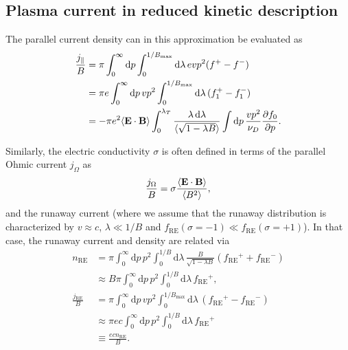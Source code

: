 \documentclass[11pt,a4paper]{article}
\newcommand{\rd}{\ensuremath{\mathrm{d}}}
\newcommand{\sub}[1]{\ensuremath{_{\text{#1}}}}
\renewcommand{\b}[1]{\ensuremath{ {\bf #1 } }}
\begin{document}
\subsection{Plasma current in reduced kinetic description}
The parallel current density can in this approximation be evaluated as
\begin{align}
\frac{j_\parallel}{B} &= \pi\int_0^\infty \rd p \int_0^{1/B\sub{max}}\rd\lambda\, evp^2(f^+-f^-) \nonumber \\
&=\pi e\int_0^\infty \rd p\,vp^2 \int_0^{1/B\sub{max}}\rd\lambda\, (f_1^+-f_1^-) \nonumber \\
&= -\pi  e^2\langle \b{E}\cdot\b{B}\rangle \int_0^{\lambda_T}\frac{\lambda\,\rd \lambda}{\langle\sqrt{1-\lambda B}\rangle}\int \rd p \, \frac{vp^2}{\nu_D}\frac{\partial f_0}{\partial p}.
\end{align}

Similarly, the electric conductivity $\sigma$ is often defined in terms of the parallel Ohmic current $j_\Omega$ as
\begin{align}
\frac{j_\Omega}{B} = \sigma \frac{\langle \b{E}\cdot\b{B} \rangle}{\langle B^2\rangle},
\end{align}
and the runaway current (where we assume that the runaway distribution is characterized by $v\approx c$, $\lambda \ll 1/B$ and $f\sub{RE}(\sigma=-1) \ll f\sub{RE}(\sigma=+1)$). In that case, the runaway current and density are related via
\begin{align}
n\sub{RE} &= \pi\int_0^\infty \rd p \,p^2\int_0^{1/B}\rd \lambda \,\frac{B}{\sqrt{1-\lambda B}}(f\sub{RE}^+ + f\sub{RE}^-) \nonumber \\
&\approx B \pi \int_0^\infty \rd p \,p^2\int_0^{1/B}\rd \lambda \, f\sub{RE}^+, \nonumber \\
\frac{j\sub{RE}}{B} &= \pi\int_0^\infty \rd p \,vp^2 \int_0^{1/B\sub{max}}\rd\lambda \, (f\sub{RE}^+-f\sub{RE}^-)\nonumber \\
&\approx  \pi ec\int_0^\infty \rd p \,p^2 \int_0^{1/B}\rd\lambda \, f\sub{RE}^+ \nonumber \\
&\equiv \frac{ec n\sub{RE}}{B}.
\end{align}
\end{document}

